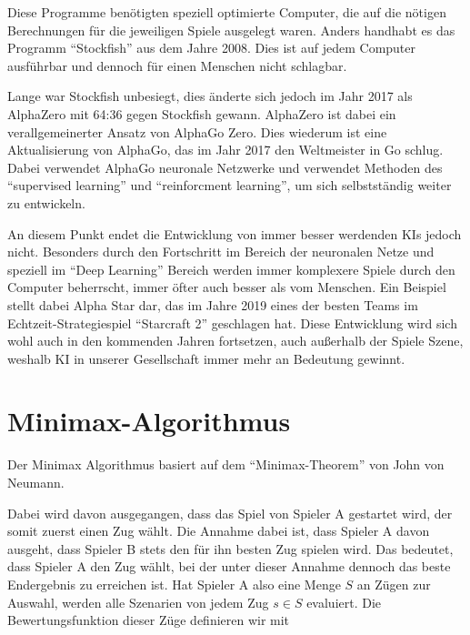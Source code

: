
Diese Programme benötigten speziell optimierte Computer, die auf die nötigen Berechnungen für die jeweiligen Spiele ausgelegt waren. Anders handhabt es das Programm ``Stockfish'' aus dem Jahre 2008. Dies ist auf jedem Computer ausführbar und dennoch für einen Menschen nicht schlagbar.

Lange war Stockfish unbesiegt, dies änderte sich jedoch im Jahr 2017 als AlphaZero mit 64:36 gegen Stockfish gewann. AlphaZero ist dabei ein verallgemeinerter Ansatz von AlphaGo Zero. Dies wiederum ist eine Aktualisierung von AlphaGo, das im Jahr 2017 den Weltmeister in Go schlug. Dabei verwendet AlphaGo neuronale Netzwerke und verwendet Methoden des ``supervised learning'' und ``reinforcment learning'', um sich selbstständig weiter zu entwickeln. \cite{Fischer}


An diesem Punkt endet die Entwicklung von immer besser werdenden KIs jedoch nicht. Besonders durch den Fortschritt im Bereich der neuronalen Netze und speziell im ``Deep Learning'' Bereich werden immer komplexere Spiele durch den Computer beherrscht, immer öfter auch besser als vom Menschen. Ein Beispiel stellt dabei Alpha Star dar, das im Jahre 2019 eines der besten Teams im Echtzeit-Strategiespiel ``Starcraft 2'' geschlagen hat. Diese Entwicklung wird sich wohl auch in den kommenden Jahren fortsetzen, auch außerhalb der Spiele Szene, weshalb KI in unserer Gesellschaft immer mehr an Bedeutung gewinnt. \cite{OriolVinyalsIgorBabuschkinJunyoungChungMichaelMathieuMaxJaderbergWojtekCzarneckiAndrewDudzikAjaHuangPetkoGeorgievRichardPowellTimoEwaldsDanHorganManuelKroissIvoDanihelkaJohnAgapiouJunhyukOhValentinDalibard}


\section{Minimax-Algorithmus}\label{minimax}

Der Minimax Algorithmus basiert auf dem ``Minimax-Theorem'' von John von Neumann.

Dabei wird davon ausgegangen, dass das Spiel von Spieler A gestartet wird, der somit zuerst einen Zug wählt. Die Annahme dabei ist, dass Spieler A davon ausgeht, dass Spieler B stets den für ihn besten Zug spielen wird. Das bedeutet, dass Spieler A den Zug wählt, bei der unter dieser Annahme dennoch das beste Endergebnis zu erreichen ist. Hat Spieler A also eine Menge $S$ an Zügen zur Auswahl, werden alle Szenarien von jedem Zug $s \in S$ evaluiert. Die Bewertungsfunktion dieser Züge definieren wir mit

